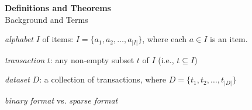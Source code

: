 \noindent
\textbf{\LARGE Definitions and Theorems} \\
\large Background and Terms

\normalsize

 \textit{alphabet} $I$ of items: $I = \{a_1, a_2, \ldots , a_{|I|}\}$, where each $a \in I$ is an item.

 \textit{transaction} $t$: any non-empty subset $t$ of $I$ (i.e., $t \subseteq I$)

 \textit{dataset} $D$: a collection of transactions, where $D = \{t_1, t_2, \ldots , t_{|D|}\}$

 \textit{binary format} vs. \textit{sparse format}